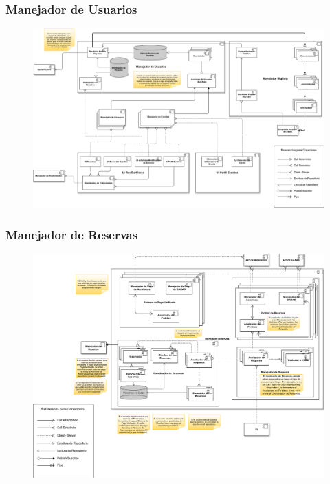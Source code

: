 \subsubsection{Manejador de Usuarios}

\begin{figure}[H]
  \centering
  \includegraphics[width=\textwidth]{diagramas/ManejadorDeUsuarios.png}
  \caption{\normalfont }
\end{figure} 

\subsubsection{Manejador de Reservas}

\begin{figure}[H]
  \centering
  \includegraphics[width=\textwidth]{diagramas/ManejadorReservas.png}
  \caption{\normalfont }
\end{figure} 


